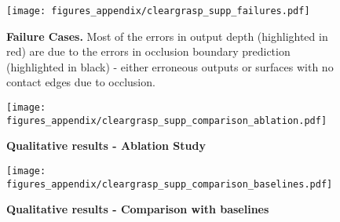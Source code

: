 \documentclass[letterpaper, 10 pt, conference]{ieeeconf}
\begin{document}
\begin{figure*}[pht]
  \centering
  \texttt{[image: figures\_appendix/cleargrasp\_supp\_failures.pdf]}
  \caption{\textbf{Failure Cases.} Most of the errors in output depth (highlighted in red) are due to the errors in occlusion boundary prediction (highlighted in black) - either erroneous outputs or surfaces with no contact edges due to occlusion.}
  \label{fig:failure_cases}
  
  \vspace*{\floatsep}

  \texttt{[image: figures\_appendix/cleargrasp\_supp\_comparison\_ablation.pdf]}
  \caption{\textbf{Qualitative results - Ablation Study}}
  \label{fig:ablation_study}
\end{figure*}

\begin{figure*}[ph]
    \centering
    \vspace{-5mm}
    \texttt{[image: figures\_appendix/cleargrasp\_supp\_comparison\_baselines.pdf]}
    \vspace{-4mm}
    \caption{\textbf{Qualitative results - Comparison with baselines}}
    \label{fig:comparison_baselines}
\end{figure*}
\end{document}
